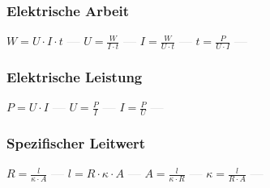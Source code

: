 \subsubsection{Elektrische Arbeit} 
\begin{minipage}{0.45\textwidth} 
\end{minipage} 
\begin{minipage}{0.45\textwidth} 
 
\end{minipage} 
$ W = U\cdot I\cdot t $ \textcolor{lightgray}{\textbf{---}} 
$ U = \frac{W}{I\cdot t} $ \textcolor{lightgray}{\textbf{---}} 
$ I = \frac{W}{U\cdot t} $ \textcolor{lightgray}{\textbf{---}} 
$ t = \frac{ P}{U\cdot I} $ \textcolor{lightgray}{\textbf{---}} 

\subsubsection{Elektrische Leistung} 
\begin{minipage}{0.45\textwidth} 
\end{minipage} 
\begin{minipage}{0.45\textwidth} 
 
\end{minipage} 
$ P = U\cdot I $ \textcolor{lightgray}{\textbf{---}} 
$ U = \frac{P}{I} $ \textcolor{lightgray}{\textbf{---}} 
$ I = \frac{P}{U} $ \textcolor{lightgray}{\textbf{---}} 

\subsubsection{Spezifischer Leitwert} 
\begin{minipage}{0.45\textwidth} 
\end{minipage} 
\begin{minipage}{0.45\textwidth} 
 
\end{minipage} 
$ R = \frac{ l}{\kappa \cdot A} $ \textcolor{lightgray}{\textbf{---}} 
$ l = R\cdot \kappa \cdot A $ \textcolor{lightgray}{\textbf{---}} 
$ A = \frac{l}{\kappa \cdot R} $ \textcolor{lightgray}{\textbf{---}} 
$ \kappa  = \frac{ l}{R\cdot A} $ \textcolor{lightgray}{\textbf{---}} 

